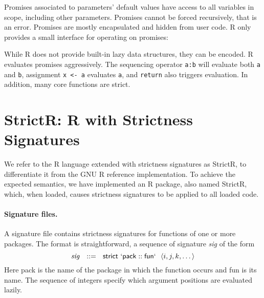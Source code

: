 \documentclass[review,nonacm,screen,acmsmall,anonymous=true]{acmart}
\newcommand{\code}[1]{\lstinline |#1|\xspace}
\newcommand{\strictr}{{\sf StrictR}\xspace}
\begin{document}
\noindent
Promises associated to parameters' default values have access to all variables
in scope, including other parameters. Promises cannot be forced recursively,
that is an error. Promises are mostly encapsulated and hidden from user code. R
only provides a small interface for operating on promises:

\noindent
While R does not provide built-in lazy data structures, they can be encoded. R
evaluates promises aggressively. The sequencing operator \code{a:b} will
evaluate both \code a and \code b, assignment \code{x <- a} evaluates \code a, and
\code{return} also triggers evaluation. In addition, many core functions are
strict.

\newpage %
\section{StrictR: R with Strictness Signatures}\label{sec:strictr}

We refer to the R language extended with strictness signatures as \strictr, to
differentiate it from the GNU R reference implementation. To achieve the
expected semantics, we have implemented an R package, also named \strictr,
which, when loaded, causes strictness signatures to be applied to all loaded
code.

\paragraph{Signature files.}
A signature file contains strictness signatures for functions of one or more
packages. The format is straightforward, a sequence of signature \emph{sig} of
the form
%
\[
\mathit{sig}~~::=~~\mathsf{strict}~\mathsf{`pack}::\mathsf{fun`}~~\langle i, j, k, \dots\rangle
\]
%
Here {\sf pack} is the name of the package in which the function occurs and {\sf
  fun} is its name. The sequence of integers specify which argument positions
are evaluated lazily.
\end{document}
